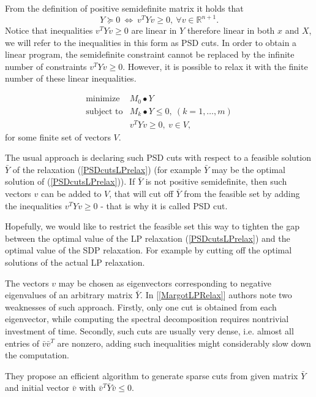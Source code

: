 \documentclass[12pt]{book}
\theoremstyle{definition}
\begin{document}
From the definition of positive semidefinite matrix it holds that
\begin{equation*}
Y\succeq 0 \ \Leftrightarrow \ v^TYv \geq 0, \ \forall v\in\mathbb{R}^{n+1}.
\end{equation*}
Notice that inequalities $ v^TYv \geq 0$ are linear in $Y$ therefore linear in both $x$ and $X$, we will refer to the inequalities in this form as PSD cuts.
In order to obtain a linear program, the semidefinite constraint cannot be replaced by the infinite number of constraints  $v^TYv \geq 0$.
However, it is possible to relax it with the finite number of these linear inequalities. 

\begin{equation}
\label{PSDcutsLPrelax} 
\begin{array}{ll}
\mbox{minimize}& M_0\bullet Y \\
\mbox{subject to}& M_k\bullet Y \leq 0, \  (k = 1,\dots ,m)\\
& v^TYv\geq 0, \ v\in V,
\end{array} 
\end{equation}
for some finite set of vectors $V$.

The usual approach is declaring such PSD cuts with respect to a feasible solution $\bar{Y}$ of the relaxation (\ref{PSDcutsLPrelax}) (for example $\bar{Y}$ may be the optimal solution of (\ref{PSDcutsLPrelax})). If $\bar{Y}$ is not positive semidefinite, then such vectors $v$ can be added to $V$, that will cut off $\bar{Y}$ from the feasible set by adding the inequalities $v^TYv\geq 0$ - that is why it is called PSD cut. 

Hopefully, we would like to restrict the feasible set this way to tighten the gap between the optimal value of the LP relaxation (\ref{PSDcutsLPrelax}) and the optimal value of the SDP relaxation. For example by cutting off the optimal solutions of the actual LP relaxation.


The vectors $v$ may be chosen as eigenvectors corresponding to negative eigenvalues of an arbitrary matrix $\bar{Y}$.
In [\ref{MargotLPRelax}] authors note two weaknesses of such approach. Firstly, only one cut is
obtained from each eigenvector, while computing the spectral decomposition requires nontrivial investment of time. Secondly,
such cuts are usually very dense, i.e. almost all entries of $\bar{v}\bar{v}^T$ are nonzero, adding such inequalities might considerably slow down the computation. 

They propose an efficient algorithm to generate sparse cuts from given matrix $\bar{Y}$ and initial vector $\bar{v}$ with $\bar{v}^{T}\bar{Y}\bar{v} \leq 0$. 
\end{document}
